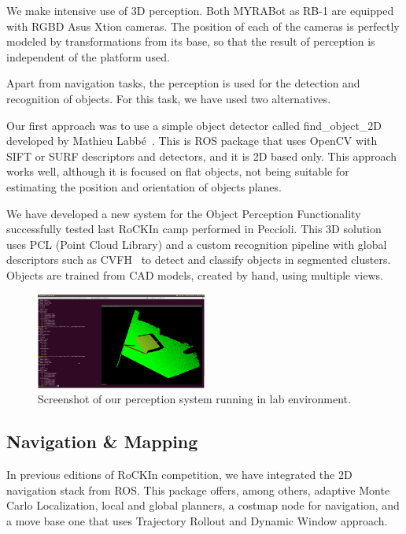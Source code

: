 \documentclass[conference]{IEEEtran}
\begin{document}
We make intensive use of 3D perception. Both MYRABot as RB-1 are equipped with RGBD
Asus Xtion cameras. The position of each of the cameras is perfectly modeled by
transformations from its base, so that the result of perception is independent of the
platform used.

Apart from navigation tasks, the perception is used for the detection and recognition of
objects. For this task, we have used two alternatives. 

Our first approach was to use a  simple object detector called find\_object\_2D
developed by Mathieu Labbé~\cite{Mathieu2015}. This is ROS package that uses OpenCV with SIFT or SURF
descriptors and detectors, and it is 2D based only. This approach works well, although
it is focused on flat objects, not being suitable for estimating the position and
orientation of objects planes.

We have developed a new system for the Object Perception Functionality successfully tested last RoCKIn camp performed in Peccioli. 
This 3D solution uses PCL (Point Cloud Library) and a custom recognition
pipeline with global descriptors such as CVFH~\cite{aldoma2012our} to detect and classify objects in
segmented clusters. Objects are trained from CAD models, created by hand, using
multiple views.



\begin{figure}[ht]
  \centering
  \includegraphics[width=0.5\textwidth]{Screenshot}
  \caption{Screenshot of our perception system running in lab environment.} 
  \label{fig:perception}
\end{figure}



\subsection{Navigation \& Mapping}

In previous editions of RoCKIn competition,  we have integrated the 2D navigation
stack from ROS\cite{tbd}. This package offers, among others, adaptive Monte Carlo Localization,
local and global planners, a costmap node for navigation, and a move base one that uses
Trajectory Rollout and Dynamic Window approach. 
\end{document}

